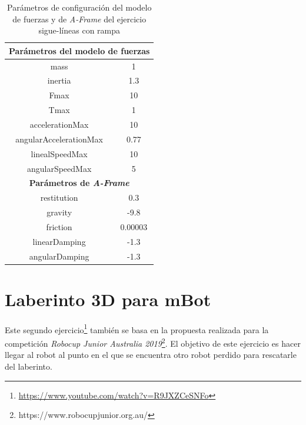 \begin{table}[h!]
\centering
\begin{tabular}{|c|c|}
\hline
\multicolumn{2}{|c|}{\textbf{Parámetros del modelo de fuerzas}}                \\ \hline
mass                                           & 1                             \\ \hline
inertia                                        & 1.3                           \\ \hline
Fmax                                           & 10                            \\ \hline
Tmax                                           & 1                             \\ \hline
accelerationMax                                & 10                            \\ \hline
angularAccelerationMax                         & 0.77                          \\ \hline
linealSpeedMax                                 & 10                            \\ \hline
angularSpeedMax                                & 5                             \\ \hline
\multicolumn{2}{|c|}{\textbf{Parámetros de \textit{A-Frame}}} \\ \hline
restitution                                    & 0.3                           \\ \hline
gravity                                        & -9.8                          \\ \hline
friction                                       & 0.00003                       \\ \hline
linearDamping                                  & -1.3                          \\ \hline
angularDamping                                 & -1.3                          \\ \hline
\end{tabular}
\caption{Parámetros de configuración del modelo de fuerzas y de \textit{A-Frame} del ejercicio sigue-líneas con rampa}
\label{tabla:param_ej1}
\end{table}

\newpage
\section{Laberinto 3D para mBot}
Este segundo ejercicio\footnote{\url{https://www.youtube.com/watch?v=R9JXZCeSNFo}} también se basa en la propuesta realizada para la competición \textit{Robocup Junior Australia 2019}\footnote{https://www.robocupjunior.org.au/}. El objetivo de este ejercicio es hacer llegar al robot al punto en el que se encuentra otro robot perdido para rescatarle del laberinto. \newline

